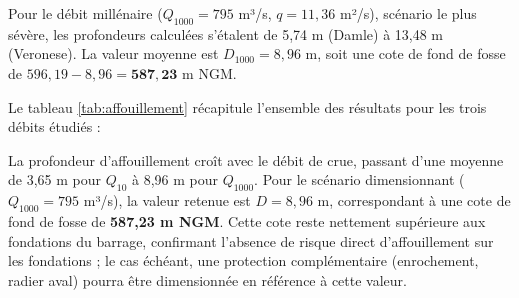 Pour le débit millénaire ($Q_{1000} = 795$ m³/s, $q = 11{,}36$ m²/s), scénario le plus sévère, les profondeurs calculées s'étalent de 5,74 m (Damle) à 13,48 m (Veronese). La valeur moyenne est $D_{1000} = 8{,}96$ m, soit une cote de fond de fosse de $596{,}19 - 8{,}96 = \mathbf{587{,}23}$ m NGM.

\medskip
Le tableau \ref{tab:affouillement} récapitule l'ensemble des résultats pour les trois débits étudiés :

\begin{table}[H]
    \centering
    \caption{Profondeur d'affouillement $D$ (m) et cote de fond de fosse (m NGM) — comparaison des quatre formules empiriques pour les trois débits de crue (PHE\,aval $= 596{,}19$ m NGM)}
    \label{tab:affouillement}
\end{table}

La profondeur d'affouillement croît avec le débit de crue, passant d'une moyenne de 3,65 m pour $Q_{10}$ à 8,96 m pour $Q_{1000}$. Pour le scénario dimensionnant ($Q_{1000} = 795$ m³/s), la valeur retenue est $D = 8{,}96$ m, correspondant à une cote de fond de fosse de \textbf{587,23 m NGM}. Cette cote reste nettement supérieure aux fondations du barrage, confirmant l'absence de risque direct d'affouillement sur les fondations ; le cas échéant, une protection complémentaire (enrochement, radier aval) pourra être dimensionnée en référence à cette valeur.

